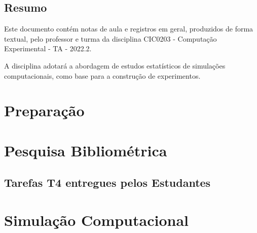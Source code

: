 \documentclass[12pt]{book}
\begin{document}
\pagestyle{fancy}

	\chapter*{Resumo}

	Este documento contém notas de aula e registros em geral, produzidos de forma textual, pelo professor e turma da disciplina CIC0203 - Computação Experimental - TA - 2022.2.
	
	A disciplina adotará a abordagem de estudos estatísticos de simulações computacionais, como base para a construção de experimentos.

\part{Preparação\label{part:intro}}

    

    

    

	 
    
    
    

    

\part{Pesquisa Bibliométrica\label{part:biblio}}

    

    

    

\chapter{Tarefas T4 entregues pelos Estudantes}

    

\part{Simulação Computacional\label{part:simulacao}}
\end{document}

